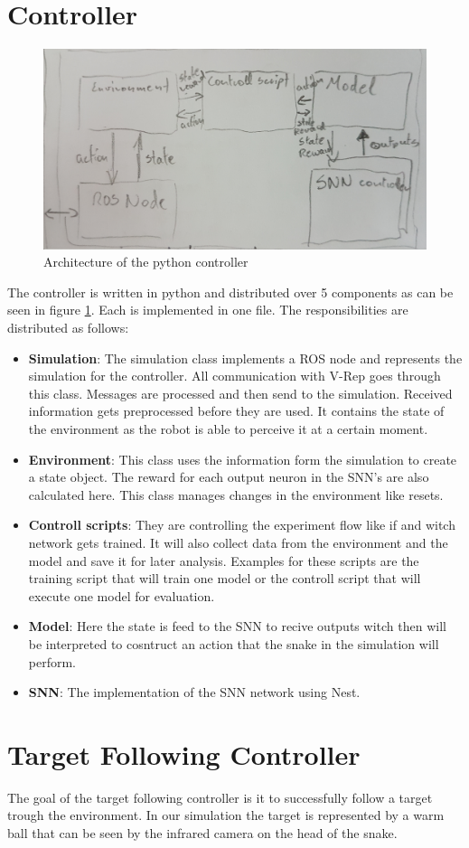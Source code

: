 \section{Controller}

\begin{figure}
	\includegraphics[width=\linewidth]{images/controller.jpg}
	\caption{Architecture of the python controller}
	\label{fig:controller}
\end{figure}

The controller is written in python and distributed over 5 components as can be seen in figure \ref{fig:controller}. Each is implemented in one file. The responsibilities are distributed as follows:

\begin{itemize}
	\item \textbf{Simulation}: The simulation class implements a ROS node and represents the simulation for the controller. All communication with V-Rep goes through this class. Messages are processed and then send to the simulation. Received information gets preprocessed before they are used. It contains the state of the environment as the robot is able to perceive it at a certain moment.
	\item \textbf{Environment}: This class uses the information form the simulation to create a state object. The reward for each output neuron in the SNN's are also calculated here. This class manages changes in the environment like resets.
	\item \textbf{Controll scripts}: They are controlling the experiment flow like if and witch network gets trained. It will also collect data from the environment and the model and save it for later analysis. Examples for these scripts are the training script that will train one model or the controll script that will execute one model for evaluation.
	\item \textbf{Model}: Here the state is feed to the SNN to recive outputs witch then will be interpreted to cosntruct an action that the snake in the simulation will perform.
	\item \textbf{SNN}: The implementation of the SNN network using Nest.
\end{itemize}


\section{Target Following Controller}

The goal of the target following controller is it to successfully follow a target trough the environment. In our simulation the target is represented by a warm ball that can be seen by the infrared camera on the head of the snake.